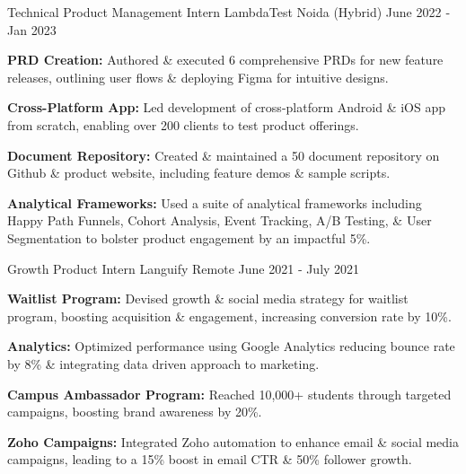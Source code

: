 \begin{cventries}
  \cventry
    {Technical Product Management Intern} %
    {LambdaTest } %
    {Noida (Hybrid)} %
    {June 2022 ‑ Jan 2023} %
    {
      \begin{cvitems} %
        \item {\textbf{PRD Creation:  }Authored \& executed 6 comprehensive PRDs for new feature releases, outlining user flows \& deploying Figma for intuitive designs.}
        \item {\textbf{Cross-Platform App:  }Led development of cross-platform Android \& iOS app from scratch, enabling over 200 clients to test product offerings.}
        \item {\textbf{Document Repository:  }Created \& maintained a 50 document repository on Github \& product website, including feature demos \& sample scripts.}
        \item {\textbf{Analytical Frameworks:  }Used a suite of analytical frameworks including Happy Path Funnels, Cohort Analysis, Event Tracking, A/B Testing, \& User Segmentation to bolster product engagement by an impactful 5\%.}
      \end{cvitems}
    }

  \cventry
    {Growth Product Intern} %
    {Languify} %
    {Remote} %
    {June 2021 ‑ July 2021} %
    {
      \begin{cvitems} %
        \item {\textbf{Waitlist Program:  }Devised growth \& social media strategy for waitlist program, boosting acquisition \& engagement, increasing conversion rate by 10\%.}
        \item {\textbf{Analytics:  }Optimized performance using Google Analytics reducing bounce rate by 8\% \& integrating data driven approach to marketing.}
        \item {\textbf{Campus Ambassador Program:  }Reached 10,000+ students through targeted campaigns, boosting brand awareness by 20\%.}
        \item {\textbf{Zoho Campaigns:  }Integrated Zoho automation to enhance email \& social media campaigns, leading to a 15\% boost in email CTR \& 50\% follower growth.}
      \end{cvitems}
    }


\end{cventries}
